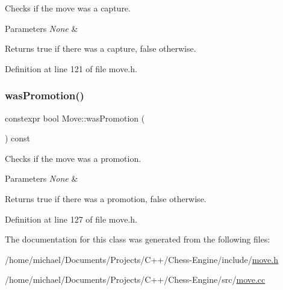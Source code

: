 Checks if the move was a capture. 


\begin{DoxyParams}{Parameters}
{\em None} & \\
\hline
\end{DoxyParams}
\begin{DoxyReturn}{Returns}
true if there was a capture, false otherwise. 
\end{DoxyReturn}


Definition at line 121 of file move.\+h.

\mbox{\label{classMove_a06483745a13016873fc99db2ea74e042}} 
\subsubsection{\texorpdfstring{was\+Promotion()}{wasPromotion()}}
{\footnotesize\ttfamily constexpr bool Move\+::was\+Promotion (\begin{DoxyParamCaption}{ }\end{DoxyParamCaption}) const\hspace{0.3cm}{\ttfamily [inline]}}



Checks if the move was a promotion. 


\begin{DoxyParams}{Parameters}
{\em None} & \\
\hline
\end{DoxyParams}
\begin{DoxyReturn}{Returns}
true if there was a promotion, false otherwise. 
\end{DoxyReturn}


Definition at line 127 of file move.\+h.



The documentation for this class was generated from the following files\+:\begin{DoxyCompactItemize}
\item 
/home/michael/\+Documents/\+Projects/\+C++/\+Chess-\/\+Engine/include/\mbox{\hyperlink{move_8h}{move.\+h}}\item 
/home/michael/\+Documents/\+Projects/\+C++/\+Chess-\/\+Engine/src/\mbox{\hyperlink{move_8cc}{move.\+cc}}\end{DoxyCompactItemize}
